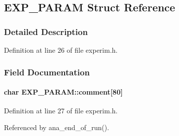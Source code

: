 \subsection{EXP\_\-PARAM Struct Reference}
\label{structEXP__PARAM}


\subsubsection{Detailed Description}


Definition at line 26 of file experim.h.

\subsubsection{Field Documentation}
\paragraph[{comment}]{\setlength{\rightskip}{0pt plus 5cm}char {\bf EXP\_\-PARAM::comment}\mbox{[}80\mbox{]}}\hfill\label{structEXP__PARAM_a951d45e03a4e8f5a8b4218be891de618}


Definition at line 27 of file experim.h.

Referenced by ana\_\-end\_\-of\_\-run().